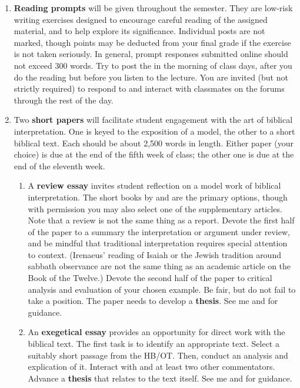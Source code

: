 \documentclass[titlepage]{article}
\begin{document}
\begin{enumerate}

	\item \textbf{Reading prompts} will be given throughout the
	semester. They are low-risk writing exercises designed to encourage
	careful reading of the assigned material, and to help explore its
	significance. Individual posts are not marked, though points may be
	deducted from your final grade if the exercise is not taken
	seriously. In general, prompt responses submitted online should not
	exceed 300 words. Try to post the in the morning of class days,
	after you do the reading but before you listen to the lecture. You
	are invited (but not strictly required) to respond to and interact
	with classmates on the forums through the rest of the day.

	\item Two \textbf{short papers} will facilitate student engagement
	with the art of biblical interpretation. One is keyed to the
	exposition of a model, the other to a short biblical text. Each
	should be about 2,500 words in length. Either paper (your choice) is
	due at the end of the fifth week of class; the other one is due at
	the end of the eleventh week.%

	\begin{enumerate}

		\item A \textbf{review essay} invites student reflection on a
		model work of biblical interpretation. The short books by
		\cite{heschel} and \cite{irenaeus} are the primary options,
		though with permission you may also select one of the
		supplementary articles. Note that a review is not the same thing
		as a report. Devote the first half of the paper to a summary the
		interpretation or argument under review, and be mindful that
		traditional interpretation requires special attention to
		context. (Irenaeus' reading of Isaiah or the Jewish tradition
		around sabbath observance are not the same thing as an academic
		article on the Book of the Twelve.) Devote the second half of
		the paper to critical analysis and evaluation of your chosen
		example. Be fair, but do not fail to take a position. The paper
		needs to develop a \textbf{thesis}. See me and \cite[Chs 3, 5–7,
		11]{rlgs} for guidance.

		\item An \textbf{exegetical essay} provides an opportunity for
		direct work with the biblical text. The first task is to
		identify an appropriate text. Select a suitably short passage
		from the HB/OT. Then, conduct an analysis and explication of it.
		Interact with \cite{hbfb} and at least two other commentators.
		Advance a \textbf{thesis} that relates to the text itself. See
		me and \cite[Chs 3, 5, 8, 11]{rlgs} for guidance.


\end{enumerate}
\end{enumerate}
\end{document}
